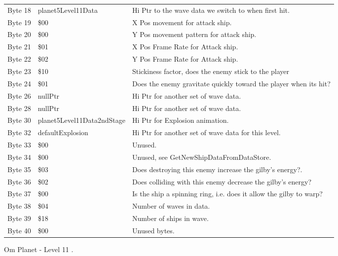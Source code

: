 \begin{figure}[H]
{\begin{adjustbox}{width=12cm}
\begin{tabular}{lll}
 Byte 18 & planet5Level11Data         & Hi Ptr to the wave data we switch to when first hit.               \\
 Byte 19 & \$00                        & X Pos movement for attack ship.                                    \\
 Byte 20 & \$00                        & Y Pos movement pattern for attack ship.                            \\
 Byte 21 & \$01                        & X Pos Frame Rate for Attack ship.                                  \\
 Byte 22 & \$02                        & Y Pos Frame Rate for Attack ship.                                  \\
 Byte 23 & \$10                        & Stickiness factor, does the enemy stick to the player              \\
 Byte 24 & \$01                        & Does the enemy gravitate quickly toward the player when its hit?   \\
 Byte 26 & nullPtr                    & Hi Ptr for another set of wave data.                               \\
 Byte 28 & nullPtr                    & Hi Ptr for another set of wave data.                               \\
 Byte 30 & planet5Level11Data2ndStage & Hi Ptr for Explosion animation.                                    \\
 Byte 32 & defaultExplosion           & Hi Ptr for another set of wave data for this level.                \\
 Byte 33 & \$00                        & Unused.                                                            \\
 Byte 34 & \$00                        & Unused, see GetNewShipDataFromDataStore.                           \\
 Byte 35 & \$03                        & Does destroying this enemy increase the gilby's energy?.           \\
 Byte 36 & \$02                        & Does colliding with this enemy decrease the gilby's energy?        \\
 Byte 37 & \$00                        & Is the ship a spinning ring, i.e. does it allow the gilby to warp? \\
 Byte 38 & \$04                        & Number of waves in data.                                           \\
 Byte 39 & \$18                        & Number of ships in wave.                                           \\
 Byte 40 & \$00                        & Unused bytes.                                                      \\
\bottomrule
\end{tabular}

  \end{adjustbox}

  }\caption*{Om Planet - Level 11
.}
\end{figure}

